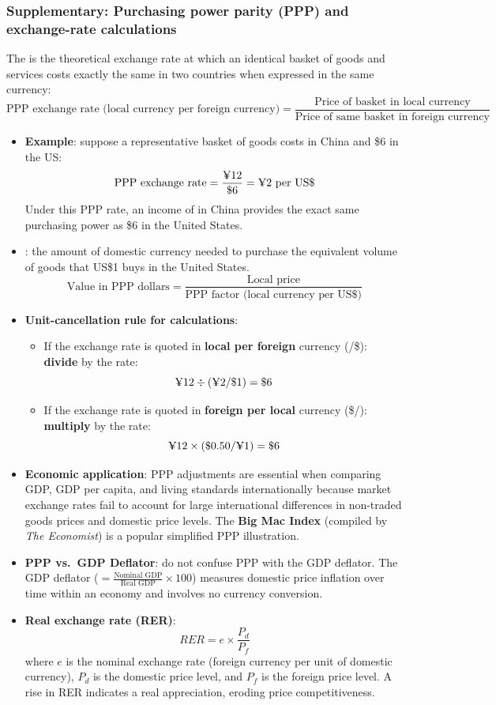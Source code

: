 \subsubsection*{Supplementary: Purchasing power parity (PPP) and exchange-rate calculations}
The  is the theoretical exchange rate at which an identical basket of goods and services costs exactly the same in two countries when expressed in the same currency:
\[\text{PPP exchange rate (local currency per foreign currency)} = \dfrac{\text{Price of basket in local currency}}{\text{Price of same basket in foreign currency}}\]
\begin{itemize}
  \item \textbf{Example}: suppose a representative basket of goods costs  in China and \$6 in the US:
  \[\text{PPP exchange rate} = \dfrac{\text{\textyen}12}{\$6} = \text{\textyen}2 \text{ per US\$}\]
  Under this PPP rate, an income of  in China provides the exact same purchasing power as \$6 in the United States.
  \item {}: the amount of domestic currency needed to purchase the equivalent volume of goods that US\$1 buys in the United States.
  \[\text{Value in PPP dollars} = \dfrac{\text{Local price}}{\text{PPP factor (local currency per US\$)}}\]
  \item \textbf{Unit-cancellation rule for calculations}:
  \begin{itemize}
    \item If the exchange rate is quoted in \textbf{local per foreign} currency (\textyen/\$): \textbf{divide} by the rate:
    \[\text{\textyen}12 \div (\text{\textyen}2 / \$1) = \$6\]
    \item If the exchange rate is quoted in \textbf{foreign per local} currency (\$/\textyen): \textbf{multiply} by the rate:
    \[\text{\textyen}12 \times (\$0.50 / \text{\textyen}1) = \$6\]
  \end{itemize}
  \item \textbf{Economic application}: PPP adjustments are essential when comparing GDP, GDP per capita, and living standards internationally because market exchange rates fail to account for large international differences in non-traded goods prices and domestic price levels. The \textbf{Big Mac Index} (compiled by \textit{The Economist}) is a popular simplified PPP illustration.
  \item \textbf{PPP vs.\ GDP Deflator}: do not confuse PPP with the GDP deflator. The GDP deflator ($= \frac{\text{Nominal GDP}}{\text{Real GDP}} \times 100$) measures domestic price inflation over time within an economy and involves no currency conversion.
  \item \textbf{Real exchange rate (RER)}:
  \[RER = e \times \dfrac{P_d}{P_f}\]
  where $e$ is the nominal exchange rate (foreign currency per unit of domestic currency), $P_d$ is the domestic price level, and $P_f$ is the foreign price level. A rise in RER indicates a real appreciation, eroding price competitiveness.
\end{itemize}

